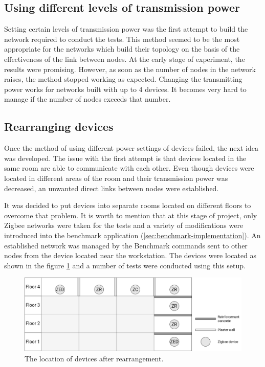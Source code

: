 \subsection*{Using different levels of transmission power}
Setting certain levels of transmission power was the first attempt
to build the network required to conduct the tests. This method seemed to be the
most appropriate for the networks which build their topology on the basis of
the effectiveness of the link between nodes. At the early stage of experiment,
the results were promising. However, as soon as the number of nodes in the 
network raises, the method stopped working as expected. Changing the 
transmitting power works for networks built with up to 4 devices. It becomes
very hard to manage if the number of nodes exceeds that number.

\subsection*{Rearranging devices}
Once the method of using different power settings of devices failed, the next
idea was developed. The issue with the first attempt is that devices located
in the same room are able to communicate with each other. Even though devices
were located in different areas of the room and their transmission power was
decreased, an unwanted direct links between nodes were established.

It was decided to put devices into separate rooms located on different floors to overcome that problem. It is worth to mention that at this stage of project, only Zigbee 
networks were taken for the tests and a variety of modifications were introduced
into the benchmark application (\ref{sec:benchmark-implementation}). An 
established network was managed by the Benchmark commands sent to other nodes
from the device located near the workstation. The devices
were located as shown in the figure \ref{fig:floor_plan} and a number of
tests were conducted using this setup.

\begin{figure}[H]
    \centering
    \includegraphics[scale=0.3]{images/floor-plan.png}
    \caption{The location of devices after rearrangement.}
    \label{fig:floor_plan}
\end{figure}


